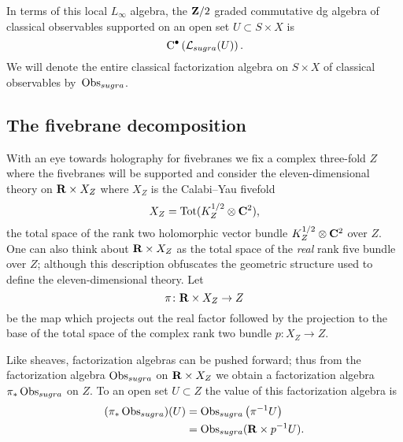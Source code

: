 \documentclass[11pt]{amsart}
\begin{document}
In terms of this local $L_\infty$ algebra, the $\mathbf{Z}/2$ graded commutative dg algebra of classical observables supported on an open set $U \subset S \times X$ is 
\[
{\rm C}^\bullet\left(\mathcal L_{sugra}(U)\right) .
\]
We will denote the entire classical factorization algebra on $S \times X$ of classical observables by~$\operatorname{Obs}_{sugra}$.



%
%
%




\subsection{The fivebrane decomposition}\label{s:resm5}

With an eye towards holography for fivebranes we fix a complex three-fold $Z$ where the fivebranes will be supported and consider the eleven-dimensional theory on $\mathbf{R} \times X_Z$ where $X_Z$ is the Calabi--Yau fivefold
\[
X_Z = \text{Tot}(K_Z^{1/2} \otimes \mathbf{C}^2),
\]
the total space of the rank two holomorphic vector bundle $K_Z^{1/2} \otimes \mathbf{C}^2$ over $Z$. 
One can also think about $\mathbf{R} \times X_Z$ as the total space of the {\em real} rank five bundle over $Z$; although this description obfuscates the geometric structure used to define the eleven-dimensional theory.
Let 
\[
\pi \colon \mathbf{R} \times X_Z \to Z 
\]
be the map which projects out the real factor followed by the projection to the base of the total space of the complex rank two bundle $p \colon X_Z \to Z$.

Like sheaves, factorization algebras can be pushed forward; thus from the factorization algebra $\operatorname{Obs}_{sugra}$ on $\mathbf{R} \times X_Z$ we obtain a factorization algebra $\pi_* \operatorname{Obs}_{sugra}$ on $Z$. 
To an open set $U \subset Z$ the value of this factorization algebra is
\begin{align*}
(\pi_* \operatorname{Obs}_{sugra}) (U) & = \operatorname{Obs}_{sugra} \left(\pi^{-1} U\right) \\
& = \operatorname{Obs}_{sugra}(\mathbf{R} \times p^{-1}U) .
\end{align*}
\end{document}
